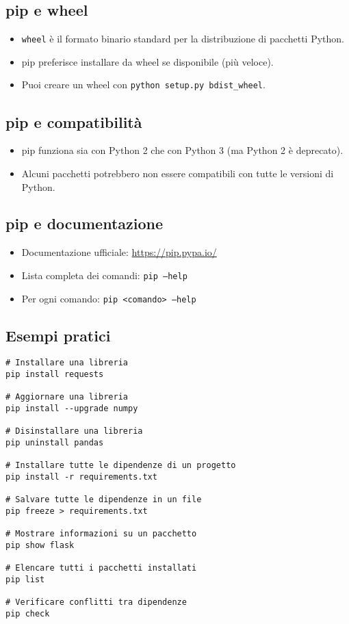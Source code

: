 \documentclass[a4paper,12pt]{article}
\begin{document}
\subsection*{pip e wheel}
\begin{itemize}
    \item \texttt{wheel} è il formato binario standard per la distribuzione di pacchetti Python.
    \item pip preferisce installare da wheel se disponibile (più veloce).
    \item Puoi creare un wheel con \texttt{python setup.py bdist\_wheel}.
\end{itemize}

\subsection*{pip e compatibilità}
\begin{itemize}
    \item pip funziona sia con Python 2 che con Python 3 (ma Python 2 è deprecato).
    \item Alcuni pacchetti potrebbero non essere compatibili con tutte le versioni di Python.
\end{itemize}

\subsection*{pip e documentazione}
\begin{itemize}
    \item Documentazione ufficiale: \url{https://pip.pypa.io/}
    \item Lista completa dei comandi: \texttt{pip --help}
    \item Per ogni comando: \texttt{pip <comando> --help}
\end{itemize}

\subsection*{Esempi pratici}
\begin{lstlisting}
# Installare una libreria
pip install requests

# Aggiornare una libreria
pip install --upgrade numpy

# Disinstallare una libreria
pip uninstall pandas

# Installare tutte le dipendenze di un progetto
pip install -r requirements.txt

# Salvare tutte le dipendenze in un file
pip freeze > requirements.txt

# Mostrare informazioni su un pacchetto
pip show flask

# Elencare tutti i pacchetti installati
pip list

# Verificare conflitti tra dipendenze
pip check
\end{lstlisting}
\end{document}
